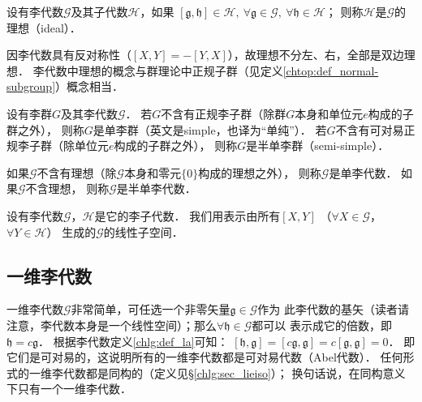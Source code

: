 \begin{definition}
    设有李代数$\mathscr{G}$及其子代数$\mathscr{H}$，如果
    $   [\mathfrak{g},\mathfrak{h}]\in  \mathscr{H},\ 
    \forall \mathfrak{g}\in \mathscr{G}, \ \forall\mathfrak{h}\in\mathscr{H}$；
    则称$\mathscr{H}$是$\mathscr{G}$的{\heiti 理想}（ideal）．
\end{definition}
因李代数具有反对称性（$[X,Y]=-[Y,X]$），故理想不分左、右，全部是双边理想．
李代数中理想的概念与群理论中正规子群（见定义\ref{chtop:def_normal-subgroup}）概念相当．




\begin{definition}
    设有李群$G$及其李代数$\mathscr{G}$．
    若$G$不含有正规李子群（除群$G$本身和单位元$e$构成的子群之外），
    则称$G$是{\heiti 单李群}（英文是simple，也译为“单纯”）．
    若$G$不含有{\kaishu 可对易}正规李子群（除单位元$e$构成的子群之外），
    则称$G$是{\heiti 半单李群}（semi-simple）．
\end{definition}

\begin{definition}    
    如果$\mathscr{G}$不含有理想（除$\mathscr{G}$本身和零元$\{0\}$构成的理想之外），
    则称$\mathscr{G}$是{\heiti 单李代数}．
    如果$\mathscr{G}$不含理想，
    则称$\mathscr{G}$是{\heiti 半单李代数}．
\end{definition}


设有李代数$\mathscr{G}$，$\mathscr{H}$是它的李子代数．
我们用表示由所有$[X,Y]$
（$\forall X\in \mathscr{G}$，$\forall Y\in\mathscr{H}$）
生成的$\mathscr{G}$的线性子空间．

\subsection{一维李代数}
一维李代数$\mathscr{G}$非常简单，可任选一个非零矢量$\mathfrak{g}\in \mathscr{G}$作为
此李代数的基矢（读者请注意，李代数本身是一个线性空间）；那么$\forall \mathfrak{h}\in \mathscr{G}$都可以
表示成它的倍数，即$\mathfrak{h} = c \mathfrak{g}$．
根据李代数定义\ref{chlg:def_la}可知：
$[\mathfrak{h},\mathfrak{g}]= [c\mathfrak{g},\mathfrak{g}] = c[\mathfrak{g},\mathfrak{g}] =0 $．
即它们是可对易的，这说明所有的一维李代数都是可对易代数（Abel代数）．
任何形式的一维李代数都是同构的（定义见\S\ref{chlg:sec_lieiso}）；
换句话说，在同构意义下只有一个一维李代数．


